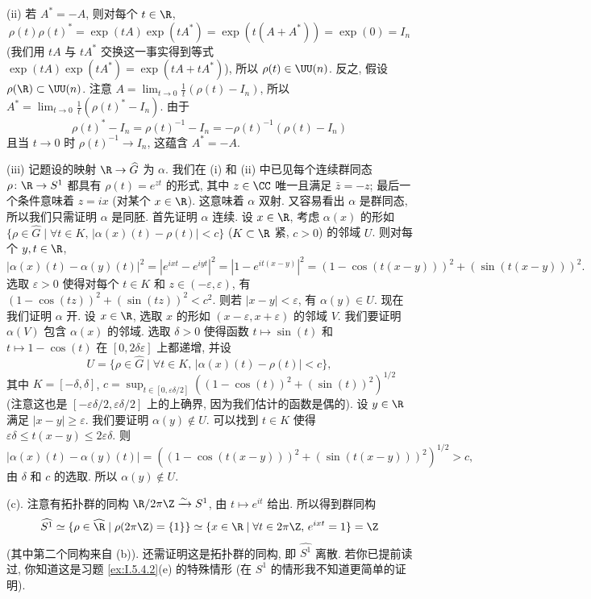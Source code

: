 \begin{solution}
(ii) 若 $A^* = -A$, 则对每个 $t \in \R$,
\[
\rho(t)\rho(t)^* = \exp(tA)\exp(tA^*) = \exp(t(A + A^*)) = \exp(0) = I_n
\]
(我们用 $tA$ 与 $tA^*$ 交换这一事实得到等式 $\exp(tA)\exp(tA^*) = \exp(tA + tA^*)$), 所以 $\rho(t) \in \UU(n)$.
反之, 假设 $\rho(\R) \subset \UU(n)$. 注意 $A = \lim_{t \to 0}\frac{1}{t}(\rho(t) - I_n)$, 所以 $A^* = \lim_{t \to 0}\frac{1}{t}(\rho(t)^* - I_n)$. 由于
\[
\rho(t)^* - I_n = \rho(t)^{-1} - I_n = -\rho(t)^{-1}(\rho(t) - I_n)
\]
且当 $t \to 0$ 时 $\rho(t)^{-1} \to I_n$, 这蕴含 $A^* = -A$.

(iii) 记题设的映射 $\R \to \widehat{G}$ 为 $\alpha$.
我们在 (i) 和 (ii) 中已见每个连续群同态 $\rho \colon \R \to S^1$ 都具有 $\rho(t) = e^{zt}$ 的形式, 其中 $z \in \CC$ 唯一且满足 $\bar{z} = -z$; 最后一个条件意味着 $z = ix$ (对某个 $x \in \R$). 这意味着 $\alpha$ 双射. 又容易看出 $\alpha$ 是群同态, 所以我们只需证明 $\alpha$ 是同胚.
首先证明 $\alpha$ 连续. 设 $x \in \R$, 考虑 $\alpha(x)$ 的形如 $\{\rho \in \widehat{G} \mid \forall t \in K,\, |\alpha(x)(t) - \rho(t)| < c\}$ ($K \subset \R$ 紧, $c > 0$) 的邻域 $U$. 则对每个 $y, t \in \R$,
\[
|\alpha(x)(t) - \alpha(y)(t)|^2 = |e^{ixt} - e^{iyt}|^2 = |1 - e^{it(x-y)}|^2 = (1 - \cos(t(x-y)))^2 + (\sin(t(x-y)))^2.
\]
选取 $\varepsilon > 0$ 使得对每个 $t \in K$ 和 $z \in (-\varepsilon, \varepsilon)$, 有 $(1 - \cos(tz))^2 + (\sin(tz))^2 < c^2$. 则若 $|x - y| < \varepsilon$, 有 $\alpha(y) \in U$.
现在我们证明 $\alpha$ 开. 设 $x \in \R$, 选取 $x$ 的形如 $(x - \varepsilon, x + \varepsilon)$ 的邻域 $V$. 我们要证明 $\alpha(V)$ 包含 $\alpha(x)$ 的邻域. 选取 $\delta > 0$ 使得函数 $t \longmapsto \sin(t)$ 和 $t \longmapsto 1 - \cos(t)$ 在 $[0, 2\delta\varepsilon]$ 上都递增, 并设
\[
U = \{\rho \in \widehat{G} \mid \forall t \in K,\, |\alpha(x)(t) - \rho(t)| < c\},
\]
其中 $K = [-\delta, \delta]$, $c = \sup_{t \in [0, \varepsilon\delta/2]}((1 - \cos(t))^2 + (\sin(t))^2)^{1/2}$ (注意这也是 $[-\varepsilon\delta/2, \varepsilon\delta/2]$ 上的上确界, 因为我们估计的函数是偶的). 设 $y \in \R$ 满足 $|x - y| \geq \varepsilon$. 我们要证明 $\alpha(y) \notin U$. 可以找到 $t \in K$ 使得 $\varepsilon\delta \leq t(x - y) \leq 2\varepsilon\delta$. 则
\[
|\alpha(x)(t) - \alpha(y)(t)| = ((1 - \cos(t(x - y)))^2 + (\sin(t(x - y)))^2)^{1/2} > c,
\]
由 $\delta$ 和 $c$ 的选取. 所以 $\alpha(y) \notin U$.

(c). 注意有拓扑群的同构 $\R/2\pi\Z \xrightarrow{\sim} S^1$, 由 $t \longmapsto e^{it}$ 给出. 所以得到群同构
\[
\widehat{S^1} \simeq \{\rho \in \widehat{\R} \mid \rho(2\pi\Z) = \{1\}\} \simeq \{x \in \R \mid \forall t \in 2\pi\Z,\, e^{ixt} = 1\} = \Z
\]
(其中第二个同构来自 (b)). 还需证明这是拓扑群的同构, 即 $\widehat{S^1}$ 离散. 若你已提前读过, 你知道这是习题 \ref{ex:I.5.4.2}(e) 的特殊情形 (在 $S^1$ 的情形我不知道更简单的证明).


\end{solution}
